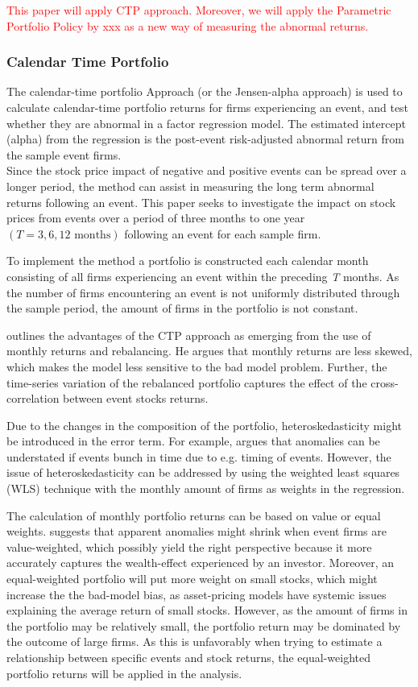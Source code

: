 \textcolor{red}{ This paper will apply CTP approach. Moreover, we will apply the Parametric Portfolio Policy by xxx as a new way of measuring the abnormal returns.} 

\subsubsection{Calendar Time Portfolio}

The calendar-time portfolio Approach (or the Jensen-alpha approach) is used to calculate calendar-time portfolio returns for firms experiencing an event, and test whether they are abnormal in a factor regression model. The estimated intercept (alpha) from the regression is the post-event risk-adjusted abnormal return from the sample event firms. \\
Since the stock price impact of negative and positive events can be spread over a longer period, the method can assist in measuring the long term abnormal returns following an event. This paper seeks to investigate the impact on stock prices from events over a period of three months to one year $(T = 3, 6, 12 \text{ months})$ following an event for each sample firm. 

To implement the method a portfolio is constructed each calendar month consisting of all firms experiencing an event within the preceding \textit{T} months. As the number of firms encountering an event is not uniformly distributed through the sample period, the amount of firms in the portfolio is not constant. 

\cite{fama1998_events} outlines the advantages of the CTP approach as emerging from the use of monthly returns and rebalancing. He argues that monthly returns are less skewed, which makes the model less sensitive to the bad model problem. Further, the time-series variation of the rebalanced portfolio captures the effect of the cross-correlation between event stocks returns. 

Due to the changes in the composition of the portfolio, heteroskedasticity might be introduced in the error term. For example, \cite{ritter1995} argues that anomalies can be understated if events bunch in time due to e.g. timing of events. However, the issue of heteroskedasticity can be addressed by using the weighted least squares (WLS) technique with the monthly amount of firms as weights in the regression\cite{Ang_event_method}.

The calculation of monthly portfolio returns can be based on value or equal weights. \cite{fama1998_events} suggests that apparent anomalies might shrink when event firms are value-weighted, which possibly yield the right perspective because it more accurately captures the wealth-effect experienced by an investor. Moreover, an equal-weighted portfolio will put more weight on small stocks, which might increase the the bad-model bias, as asset-pricing models have systemic issues explaining the average return of small stocks. However, as the amount of firms in the portfolio may be relatively small, the portfolio return may be dominated by the outcome of large firms. As this is unfavorably when trying to estimate a relationship between specific events and stock returns, the equal-weighted portfolio returns will be applied in the analysis. 

